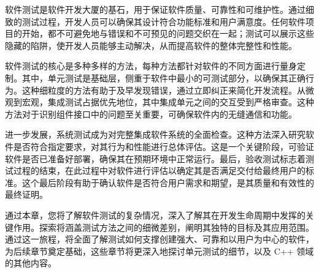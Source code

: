 软件测试是软件开发大厦的基石，用于保证软件质量、可靠性和可维护性。通过细致的测试过程，开发人员可以确保其设计符合功能标准和用户满意度。任何软件项目的开始，都不可避免地与错误和不可预见的问题交织在一起；测试可以展示这些隐藏的陷阱，使开发人员能够主动解决，从而提高软件的整体完整性和性能。

软件测试的核心是多种多样的方法，每种方法都针对软件的不同方面进行量身定制。其中，单元测试是基础层，侧重于软件中最小的可测试部分，以确保其正确行为。这种细粒度的方法有助于及早发现错误，通过立即纠正来简化开发流程。从微观到宏观，集成测试占据优先地位，其中集成单元之间的交互受到严格审查。这种方法对于识别组件接口中的问题至关重要，可确保软件内的无缝通信和功能。

进一步发展，系统测试成为对完整集成软件系统的全面检查。这种方法深入研究软件是否符合指定要求，对其行为和性能进行总体评估。这是一个关键阶段，可验证软件是否已准备好部署，确保其在预期环境中正常运行。最后，验收测试标志着测试过程的结束，在此过程中对软件进行评估以确定其是否满足交付给最终用户的标准。这个最后阶段有助于确认软件是否符合用户需求和期望，是其质量和有效性的最终证明。

通过本章，您将了解软件测试的复杂情况，深入了解其在开发生命周期中发挥的关键作用。探索将涵盖测试方法之间的细微差别，阐明其独特的目标及其应用范围。通过这一旅程，将全面了解测试如何支撑创建强大、可靠和以用户为中心的软件，为后续章节奠定基础，这些章节将更深入地探讨单元测试的细节，以及 C++ 领域的其他内容。
